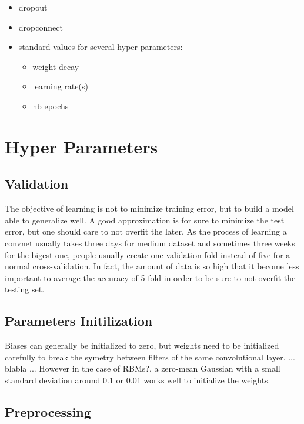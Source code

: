 \begin{itemize}
 \item dropout
 \item dropconnect
 \item standard values for several hyper parameters:
 \begin{itemize}
  \item weight decay
  \item learning rate(s)
  \item nb epochs
 \end{itemize}

\end{itemize}

\section{Hyper Parameters}

\subsection{Validation}

The objective of learning is not to minimize training error, but to build a model able to generalize well. A good approximation is for sure to minimize the test error, but one should care to not overfit the later. As the process of learning a convnet usually takes three days for medium dataset and sometimes three weeks for the bigest one, people usually create one validation fold instead of five for a normal cross-validation. In fact, the amount of data is so high that it become less important to average the accuracy of 5 fold in order to be sure to not overfit the testing set.

\subsection{Parameters Initilization}

Biases can generally be initialized to zero, but weights need to be initialized carefully to break the symetry between filters of the same convolutional layer. 
... blabla ... However in the case of RBMs?, a zero-mean Gaussian with a small standard deviation around 0.1 or 0.01 works well to initialize the weights.

\subsection{Preprocessing}



